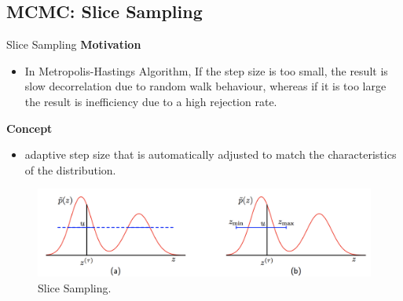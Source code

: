 \documentclass{bredelebeamer}
\begin{document}
\subsection{MCMC: Slice Sampling}
\begin{frame}{Slice Sampling}
  \textbf{Motivation}
  \begin{itemize}
    \item In Metropolis-Hastings Algorithm, If the step size is too small, the
    result is slow decorrelation due to random walk behaviour, whereas if it is
    too large the result is inefficiency due to a high rejection rate.
  \end{itemize}

  \textbf{Concept}
  \begin{itemize}
    \item adaptive step size that is automatically adjusted to match the
    characteristics of the distribution.
  \end{itemize}

  \begin{figure}
  \centering
  \includegraphics[scale=0.4]{slice_sampling.png}
  \caption{
    Slice Sampling.
  }
  \end{figure}
\end{frame}
\end{document}
